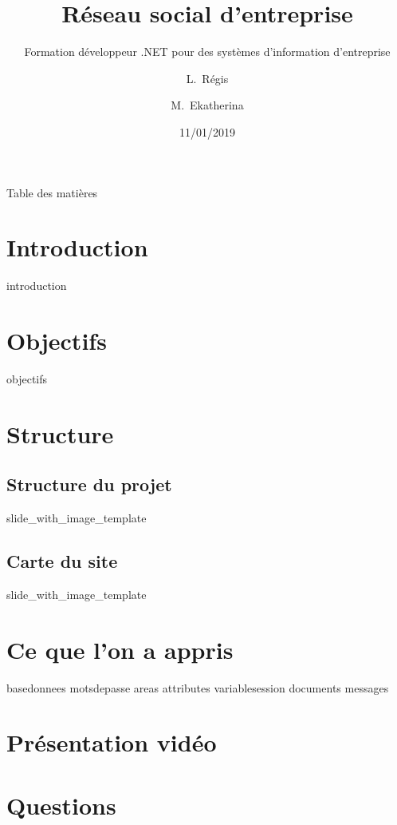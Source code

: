 \documentclass{beamer}
\title[Présentation de Projet RSE] %
{Réseau social d'entreprise}
\subtitle
{ Formation développeur .NET pour des systèmes d'information d'entreprise} %
\author[Régis, Ekatherina] %
{L.~Régis \and M.~Ekatherina}
\date[Short Occasion] %
{11/01/2019}
\begin{document}
\begin{frame}
  \titlepage
\end{frame}

\begin{frame}{Table des matières}
  \tableofcontents
\end{frame}




\section{Introduction}
 {introduction}
\section{Objectifs}
 {objectifs}
\section{Structure}

\subsection{Structure du projet}
\def\titlename{Structure du projet}
\def\imagepath{images/dataflow.png}
 {slide_with_image_template}

\subsection{Carte du site}
\def\titlename{Carte du site}
\def\imagepath{images/sitemap.png}
 {slide_with_image_template}

\section{Ce que l'on a appris}
 {basedonnees}
 {motsdepasse}
 {areas}
 {attributes}
 {variablesession}
 {documents}
 {messages}



\section{Présentation vidéo}


\section{Questions}

\end{document}
